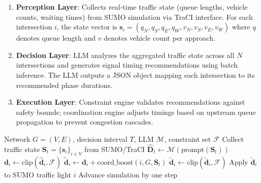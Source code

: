 \documentclass[conference]{IEEEtran}
\begin{document}
\begin{enumerate}[nosep]
    \item \textbf{Perception Layer}: Collects real-time traffic state (queue lengths, vehicle counts, waiting times) from SUMO simulation via TraCI interface. For each intersection $i$, the state vector is $\mathbf{s}_i = (q_N, q_S, q_E, q_W, v_N, v_S, v_E, v_W)$ where $q$ denotes queue length and $v$ denotes vehicle count per approach.
    \item \textbf{Decision Layer}: LLM analyzes the aggregated traffic state across all $N$ intersections and generates signal timing recommendations using batch inference. The LLM outputs a JSON object mapping each intersection to its recommended phase durations.
    \item \textbf{Execution Layer}: Constraint engine validates recommendations against safety bounds; coordination engine adjusts timings based on upstream queue propagation to prevent congestion cascades.
\end{enumerate}

\begin{algorithm}[htbp]
\caption{LLM-Guided Adaptive Signal Control}
\label{alg:framework}
\begin{algorithmic}[1]
\REQUIRE Network $G=(V,E)$, decision interval $T$, LLM $\mathcal{M}$, constraint set $\mathcal{F}$
    \STATE Collect traffic state $\mathbf{S}_t = \{\mathbf{s}_i\}_{i \in V}$ from SUMO/TraCI
        \STATE $\hat{\mathbf{D}}_t \leftarrow \mathcal{M}(\text{prompt}(\mathbf{S}_t))$ \hfill {}
            \STATE $\mathbf{d}_i \leftarrow \text{clip}(\hat{\mathbf{d}}_i, \mathcal{F})$ \hfill {}
            \STATE $\tilde{\mathbf{d}}_i \leftarrow \mathbf{d}_i + \text{coord\_boost}(i, G, \mathbf{S}_t)$ \hfill {}
            \STATE $\tilde{\mathbf{d}}_i \leftarrow \text{clip}(\tilde{\mathbf{d}}_i, \mathcal{F})$ \hfill {}
            \STATE Apply $\tilde{\mathbf{d}}_i$ to SUMO traffic light $i$
        \ENDFOR
    \ENDIF
    \STATE Advance simulation by one step
\ENDFOR
\end{algorithmic}
\end{algorithm}
\end{document}
